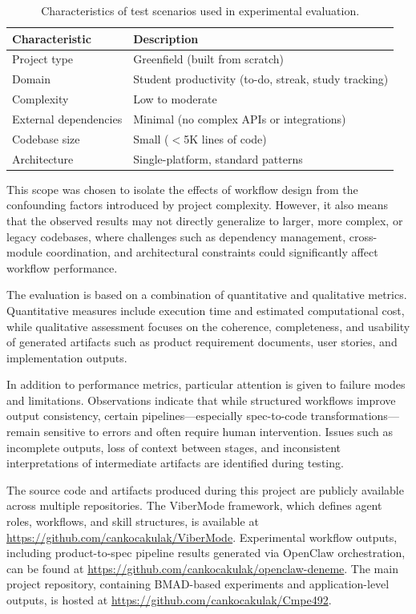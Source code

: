 \documentclass[a4paper,12pt]{report}
\begin{document}
\begin{table}[h!]
\caption[Test scenario scope]{Characteristics of test scenarios used in experimental evaluation.}
\begin{center}
\small
\begin{tabular}{|l|l|} \hline
\textbf{Characteristic} & \textbf{Description} \\\hline
Project type & Greenfield (built from scratch) \\\hline
Domain & Student productivity (to-do, streak, study tracking) \\\hline
Complexity & Low to moderate \\\hline
External dependencies & Minimal (no complex APIs or integrations) \\\hline
Codebase size & Small ($<$5K lines of code) \\\hline
Architecture & Single-platform, standard patterns \\\hline
\end{tabular}
\label{table:testScope}
\end{center}
\end{table}

This scope was chosen to isolate the effects of workflow design from the confounding factors introduced by project complexity. However, it also means that the observed results may not directly generalize to larger, more complex, or legacy codebases, where challenges such as dependency management, cross-module coordination, and architectural constraints could significantly affect workflow performance.

The evaluation is based on a combination of quantitative and qualitative metrics. Quantitative measures include execution time and estimated computational cost, while qualitative assessment focuses on the coherence, completeness, and usability of generated artifacts such as product requirement documents, user stories, and implementation outputs.

In addition to performance metrics, particular attention is given to failure modes and limitations. Observations indicate that while structured workflows improve output consistency, certain pipelines---especially spec-to-code transformations---remain sensitive to errors and often require human intervention. Issues such as incomplete outputs, loss of context between stages, and inconsistent interpretations of intermediate artifacts are identified during testing.

The source code and artifacts produced during this project are publicly available across multiple repositories. The ViberMode framework, which defines agent roles, workflows, and skill structures, is available at \url{https://github.com/cankocakulak/ViberMode}. Experimental workflow outputs, including product-to-spec pipeline results generated via OpenClaw orchestration, can be found at \url{https://github.com/cankocakulak/openclaw-deneme}. The main project repository, containing BMAD-based experiments and application-level outputs, is hosted at \url{https://github.com/cankocakulak/Cmpe492}.
\end{document}
